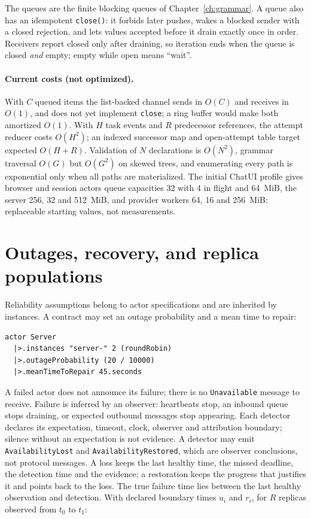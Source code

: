 The queues are the finite blocking queues of Chapter~\ref{ch:grammar}. A queue
also has an idempotent \texttt{close()}: it forbids later pushes, wakes a blocked
sender with a closed rejection, and lets values accepted before it drain exactly
once in order. Receivers report closed only after draining, so iteration ends when
the queue is closed \emph{and} empty; empty while open means ``wait''.

\paragraph{Current costs (not optimized).} With $C$ queued items the list-backed
channel sends in $O(C)$ and receives in $O(1)$, and does not yet implement
\texttt{close}; a ring buffer would make both amortized $O(1)$. With $H$ task
events and $R$ predecessor references, the attempt reducer costs $O(H^2)$; an
indexed successor map and open-attempt table target expected $O(H+R)$. Validation
of $N$ declarations is $O(N^2)$, grammar traversal $O(G)$ but $O(G^2)$ on skewed
trees, and enumerating every path is exponential only when all paths are
materialized. The initial ChatUI profile gives browser and session actors queue
capacities 32 with 4 in flight and 64~MiB, the server 256, 32 and 512~MiB, and
provider workers 64, 16 and 256~MiB: replaceable starting values, not
measurements.

\clearpage

\section{Outages, recovery, and replica populations}

Reliability assumptions belong to actor specifications and are inherited by
instances. A contract may set an outage probability and a mean time to repair:

\begin{lstlisting}
actor Server
  |>.instances "server-" 2 (roundRobin)
  |>.outageProbability (20 / 10000)
  |>.meanTimeToRepair 45.seconds
\end{lstlisting}

A failed actor does not announce its failure; there is no \texttt{Unavailable}
message to receive. Failure is inferred by an observer: heartbeats stop, an inbound
queue stops draining, or expected outbound messages stop appearing. Each detector
declares its expectation, timeout, clock, observer and attribution boundary;
silence without an expectation is not evidence. A detector may emit
\texttt{AvailabilityLost} and \texttt{AvailabilityRestored}, which are observer
conclusions, not protocol messages. A loss keeps the last healthy time, the missed
deadline, the detection time and the evidence; a restoration keeps the progress
that justifies it and points back to the loss. The true failure time lies between
the last healthy observation and detection. With declared boundary times $u_i$ and
$r_i$, for $R$ replicas observed from $t_0$ to $t_1$:

